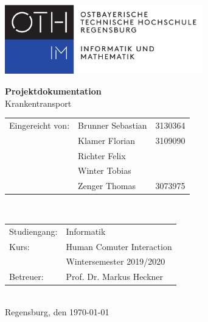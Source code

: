 \documentclass[a4paper, ngerman, 12pt]{scrartcl}
\begin{document}
\begin{titlepage}
\begin{center}
\begin{flushleft}
\includegraphics[height=30mm]{def/OTHR_FakIM_Logo}
\end{flushleft}
\vspace*{3cm}
{\Huge\textbf{Projektdokumentation}}\\
\vspace{1cm}
{\huge Krankentransport}\\
\end{center}
\vspace{\fill}
\begin{normalsize}
\begin{tabular}{p{4cm}p{4cm}p{4cm}}
Eingereicht von:	&Brunner Sebastian		&3130364\\
				&Klamer Florian		&3109090\\
				&Richter Felix			&\\
				&Winter Tobias			&\\
				&Zenger Thomas		&3073975\\
\end{tabular}\\[0.5em]
\begin{tabular}{p{4cm}p{6cm}}
Studiengang:		&Informatik			\\[0.3em]
Kurs:				&Human Comuter Interaction	\\
				&Wintersemester 2019/2020	\\[0.3em]
Betreuer:			&Prof. Dr. Markus Heckner	\\
\end{tabular}\\[3em]
Regensburg, den \today
\end{normalsize}
\vspace{1cm}
\end{titlepage}


\pagestyle{fancy}
\tableofcontents
\newpage

\listoffigures
\newpage

\end{document}
